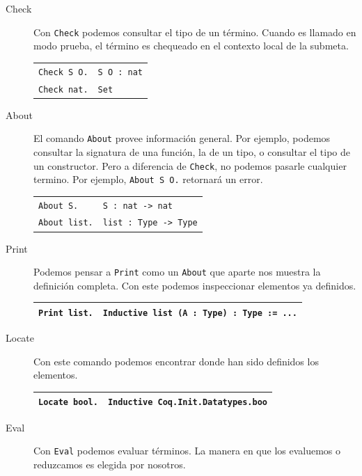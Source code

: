 \begin{description}
  \item[Check] Con \texttt{Check} podemos consultar el tipo de un término. Cuando es llamado en modo prueba, el término es chequeado en el contexto local de la submeta.
  \begin{center}
  \begin{tabular}{| l | l |}
  \hline
  \texttt{Check S O.} & \texttt{S O : nat} \\
  \texttt{Check nat.} & \texttt{Set} \\
  \hline
  \end{tabular}
  \end{center}
  \item[About] El comando \texttt{About} provee información general. Por ejemplo, podemos consultar la signatura de una función, la de un tipo, o consultar el tipo de un constructor. Pero a diferencia de \texttt{Check}, no podemos pasarle cualquier termino. Por ejemplo, \texttt{About S O.} retornará un error.
  \begin{center}
  \begin{tabular}{| l | l |}
  \hline
  \texttt{About S.} & \texttt{S : nat -> nat} \\
  \texttt{About list.} & \texttt{list : Type -> Type} \\
  \hline
  \end{tabular}
  \end{center}
  \item[Print] Podemos pensar a \texttt{Print} como un \texttt{About} que aparte nos muestra la definición completa. Con este podemos inspeccionar elementos ya definidos.
  \begin{center}
  \begin{tabular}{| l | l |}
  \hline
  \texttt{Print list.} & \texttt{Inductive list (A : Type) : Type := ...} \\
  \hline
  \end{tabular}
  \end{center}
  \item[Locate] Con este comando podemos encontrar donde han sido definidos los elementos. 
  \begin{center}
  \begin{tabular}{| l | l |}
  \hline
  \texttt{Locate bool.} & \texttt{Inductive Coq.Init.Datatypes.boo} \\
  \hline
  \end{tabular}
  \end{center}
  \item[Eval] Con \texttt{Eval} podemos evaluar términos. La manera en que los evaluemos o reduzcamos es elegida por nosotros.

\end{description}
